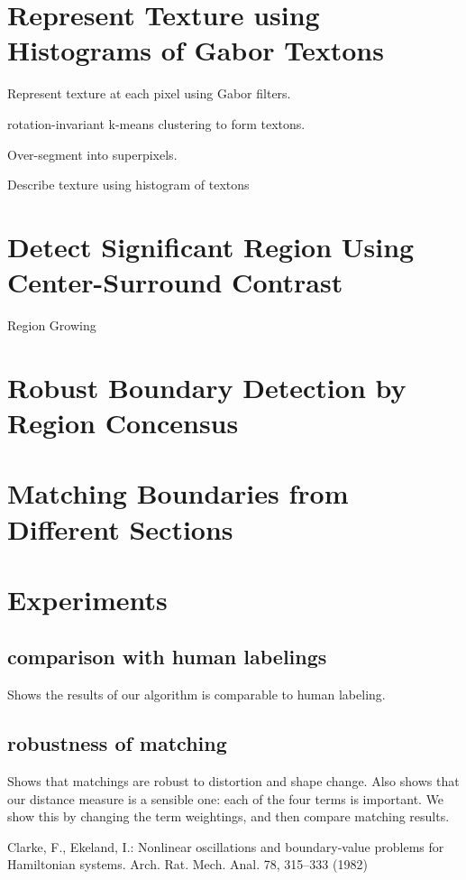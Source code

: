 \documentclass{llncs}
\begin{document}
\section{Represent Texture using Histograms of Gabor Textons}

Represent texture at each pixel using Gabor filters.

rotation-invariant k-means clustering to form textons.

Over-segment into superpixels.

Describe texture using histogram of textons


\section{Detect Significant Region Using Center-Surround Contrast}

Region Growing


\section{Robust Boundary Detection by Region Concensus}


\section{Matching Boundaries from Different Sections}



\section{Experiments}

\subsection{comparison with human labelings}

Shows the results of our algorithm is comparable to human labeling.

\begin{figure}
\vspace{2.5cm}
\caption{}
\end{figure}


\subsection{robustness of matching}

Shows that matchings are robust to distortion and shape change.
Also shows that our distance measure is a sensible one: each of the four terms is important. We show this by changing the term weightings, and then compare matching results.



%
%
\begin{thebibliography}{5}
%
Clarke, F., Ekeland, I.:
Nonlinear oscillations and
boundary-value problems for Hamiltonian systems.
Arch. Rat. Mech. Anal. 78, 315--333 (1982)

\end{thebibliography}
\end{document}
